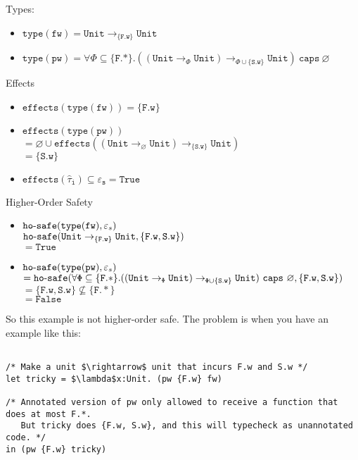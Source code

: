 \documentclass{llncs}
\newcommand{\keywadj}[1]{\mathtt{#1}}
\newcommand{\keyw}[1]{\keywadj{#1}~}
\newcommand{\kw}[1]{\keyw{ #1 }}
\newcommand{\kwa}[1]{\keywadj{ #1 }}
\newcommand{\hyphen}{\hbox{-}}
\newcommand{\Unit}[0]{ \kwa{Unit} }
\newcommand{\hosafe}[2]{ \kwa{ho \hyphen safe}(#1, #2) }
\begin{document}
\noindent
Types:
\begin{itemize}
	\item $\kwa{type(fw) = \Unit \rightarrow_{\{F.w\}} \Unit}$
	\item $\kwa{type(pw) = \forall \Phi \subseteq \{F.*\}. ((Unit \rightarrow_{\Phi} Unit) \rightarrow_{\Phi \cup \{S.w\}} Unit) ~\kw{caps} \varnothing}$
\end{itemize}

\noindent
Effects
\begin{itemize}
	\item $\kwa{effects(type(fw)) = \{F.w\}}$
	\item $\kwa{effects(type(pw))}$ \\
	$\kwa{= \varnothing \cup effects((Unit \rightarrow_{\varnothing} Unit) \rightarrow_{\{ \kwa{S.w} \}} Unit)}$\\
	$= \{\kwa{S.w}\}$
	\item $\kwa{effects(\hat \tau_i) \subseteq \varepsilon_s = True}$
\end{itemize}

\noindent
Higher-Order Safety
\begin{itemize}
	\item $\hosafe{\kwa{type(fw)}}{\varepsilon_s}$\\
		$\hosafe{\kwa{Unit \rightarrow_{\kwa\{{F.w\}}} Unit}}{\kwa{\{F.w, S.w\}}}$\\
		$= \kwa{True}$
		
	\item $\hosafe{\kwa{type(pw)}}{\varepsilon_s}$\\
		$= \hosafe{\kwa{ \forall \Phi \subseteq \{F.*\}. ((Unit \rightarrow_{\Phi} Unit) \rightarrow_{\Phi \cup \{ \kwa{S.w} \}} Unit) ~\kw{caps} \varnothing }}{\{\kwa{F.w, S.w}\}}$\\
		$= \{ \kwa{F.w, S.w} \} \not\subseteq \{ \kwa{F.*}\}$\\
		$= \kwa{False}$
\end{itemize}

\noindent
So this example is not higher-order safe. The problem is when you have an example like this:

\begin{lstlisting}

/* Make a unit $\rightarrow$ unit that incurs F.w and S.w */ 
let tricky = $\lambda$x:Unit. (pw {F.w} fw)

/* Annotated version of pw only allowed to receive a function that does at most F.*.
   But tricky does {F.w, S.w}, and this will typecheck as unannotated code. */
in (pw {F.w} tricky)
\end{lstlisting}
\end{document}

